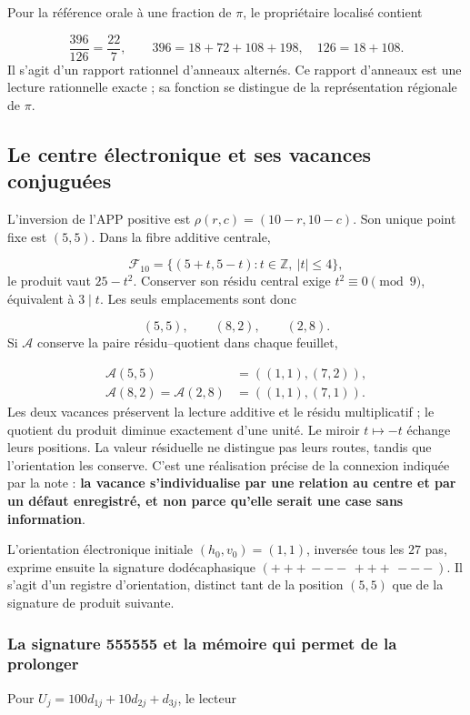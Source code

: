 Pour la référence orale à une fraction de \(\pi\), le propriétaire localisé contient

\[
\frac{396}{126}=\frac{22}{7},\qquad
396=18+72+108+198,\quad126=18+108.
\]
Il s'agit d'un rapport rationnel d'anneaux alternés. Ce rapport d'anneaux est une lecture rationnelle exacte ; sa fonction se distingue de la représentation régionale de \(\pi\).

\subsection{Le centre électronique et ses vacances conjuguées}
L'inversion de l'APP positive est \(\rho(r,c)=(10-r,10-c)\). Son unique point fixe est \((5,5)\). Dans la fibre additive centrale,

\[
\mathcal F_{10}=\{(5+t,5-t):t\in\mathbb Z,\ |t|\leq4\},
\]
le produit vaut \(25-t^2\). Conserver son résidu central exige \(t^2\equiv0\pmod9\), équivalent à \(3\mid t\). Les seuls emplacements sont donc

\[
(5,5),\qquad(8,2),\qquad(2,8).
\]
Si \(\mathcal A\) conserve la paire résidu–quotient dans chaque feuillet,

\[
\begin{aligned}
\mathcal A(5,5)&=((1,1),(7,2)),\\
\mathcal A(8,2)=\mathcal A(2,8)&=((1,1),(7,1)).
\end{aligned}
\]
Les deux vacances préservent la lecture additive et le résidu multiplicatif ; le quotient du produit diminue exactement d'une unité. Le miroir \(t\mapsto-t\) échange leurs positions. La valeur résiduelle ne distingue pas leurs routes, tandis que l'orientation les conserve. C'est une réalisation précise de la connexion indiquée par la note : \textbf{la vacance s'individualise par une relation au centre et par un défaut enregistré, et non parce qu'elle serait une case sans information}.

L'orientation électronique initiale \((h_0,v_0)=(1,1)\), inversée tous les \(27\) pas, exprime ensuite la signature dodécaphasique \((+++\,---\,+++\,---)\). Il s'agit d'un registre d'orientation, distinct tant de la position \((5,5)\) que de la signature de produit suivante.

\subsubsection*{La signature 555555 et la mémoire qui permet de la prolonger}
Pour \(U_j=100d_{1j}+10d_{2j}+d_{3j}\), le lecteur

